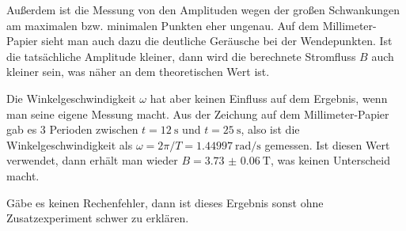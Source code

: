 	Außerdem ist die Messung von den Amplituden wegen der großen Schwankungen am maximalen bzw. minimalen Punkten eher ungenau. Auf dem Millimeter-Papier sieht man auch dazu die deutliche Geräusche bei der Wendepunkten. Ist die tatsächliche Amplitude kleiner, dann wird die berechnete Stromfluss $B$ auch kleiner sein, was näher an dem theoretischen Wert ist. 

	Die Winkelgeschwindigkeit $\omega$ hat aber keinen Einfluss auf dem Ergebnis, wenn man seine eigene Messung macht. Aus der Zeichung auf dem Millimeter-Papier gab es $3$ Perioden zwischen $t = \SI{12}{\second}$ und $t = \SI{25}{\second}$, also ist die Winkelgeschwindigkeit als $\omega = 2\pi/T = \SI{1.44997}{\radian\per\second}$ gemessen. Ist diesen Wert verwendet, dann erhält man wieder $B=\SI{3.73(6)}{\tesla}$, was keinen Unterscheid macht. 

	Gäbe es keinen Rechenfehler, dann ist dieses Ergebnis sonst ohne Zusatzexperiment schwer zu erklären.